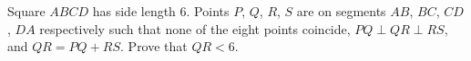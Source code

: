 Square $ABCD$ has side length $6$. Points $P$, $Q$, $R$, $S$ are on segments $AB$, $BC$, $CD$, $DA$ respectively such that none of the eight points coincide, $PQ \perp QR \perp RS$, and $QR = PQ + RS$. Prove that $QR < 6$.
